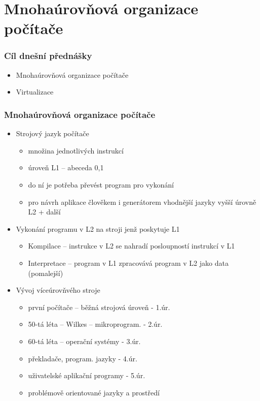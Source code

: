 \documentclass{beamer}
\subtitle{Lekce 13. Vituální stroje a virtualizace}
\author{Pavel Píša \phantom{xxxxxxxxx} Petr Štěpán \\ \small\texttt{pisa@fel.cvut.cz}\phantom{xxxx}\small\texttt{stepan@fel.cvut.cz}}
\begin{document}
\maketitle

\section{Mnohaúrovňová organizace počítače}

\begin{frame}
\frametitle{Cíl dnešní přednášky}

\begin{itemize}
 \item Mnohaúrovňová organizace počítače
 \item Virtualizace
\end{itemize}
\end{frame}

\begin{frame}
\frametitle{Mnohaúrovňová organizace počítače}

\begin{itemize}
 \item Strojový jazyk počítače
 \begin{itemize}
  \item množina jednotlivých instrukcí
  \item úroveň L1 -- abeceda {0,1}
  \item do ní je potřeba převést program pro vykonání
  \item pro návrh aplikace člověkem i generátorem vhodnější jazyky vyšší úrovně L2 + další
 \end{itemize}
 \item Vykonání programu v L2 na stroji jenž poskytuje L1
 \begin{itemize}
  \item Kompilace -- instrukce v L2 se nahradí posloupností instrukcí v L1
  \item Interpretace -- program v L1 zpracovává program v L2 jako data (pomalejší)
 \end{itemize}
 \item Vývoj víceúrovňvého stroje
 \begin{itemize}
  \item první počítače -- běžná strojová úroveň - 1.úr.
  \item 50-tá léta -- Wilkes -- mikroprogram. - 2.úr.
  \item 60-tá léta -- operační systémy - 3.úr.
  \item překladače, program. jazyky - 4.úr.
  \item uživatelské aplikační programy - 5.úr.
  \item problémově orientované jazyky a prostředí
 \end{itemize}
\end{itemize}

\end{frame}
\end{document}
